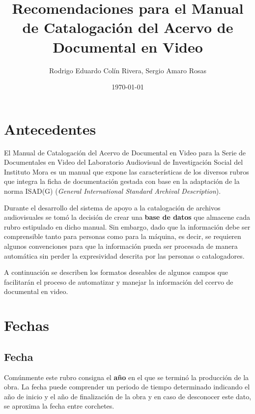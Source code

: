 \documentclass[10pt,letterpaper]{article}
\begin{document}
\title{Recomendaciones para el Manual de Catalogación del Acervo de Documental en Video}
\author{Rodrigo Eduardo Colín Rivera, Sergio Amaro Rosas}
\date{\today}
\maketitle

\setcounter{secnumdepth}{0} %
\setcounter{tocdepth}{0} %

\section{Antecedentes}
El Manual de Catalogación del Acervo de Documental en Video para la Serie de Documentales en Video del Laboratorio Audiovisual de Investigación Social del Instituto Mora es un manual que expone las características de los diversos rubros que integra la ficha de documentación gestada con base en la adaptación de la norma ISAD(G) (\textit{General International Standard Archival Description}).

Durante el desarrollo del sistema de apoyo a la catalogación de archivos audiovisuales se tomó la decisión de crear una \textbf{base de datos} que almacene cada rubro estipulado en dicho manual. Sin embargo, dado que la información debe ser comprensible tanto para personas como para la máquina, es decir, se requieren algunos convenciones para que la información pueda ser procesada de manera automática sin perder la expresividad descrita por las personas o catalogadores.

A continuación se describen los formatos deseables de algunos campos que facilitarán el proceso de automatizar y manejar la información del ccervo de documental en video.

\section{Fechas}

\subsection{Fecha}
Comúnmente este rubro consigna el \textbf{año} en el que se terminó la producción de la obra. La fecha puede comprender un periodo de tiempo determinado indicando el año de inicio y el año de finalización de la obra y en caso de desconocer este dato, se aproxima la fecha entre corchetes. 
\end{document}
